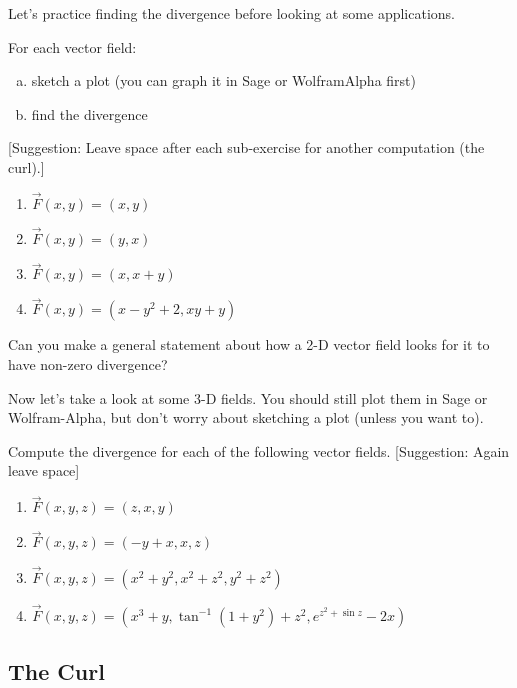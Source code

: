 Let's practice finding the divergence before looking at some applications.

\begin{problem}\label{2d_div}
\vskip0.1in
For each vector field: \\
\begin{enumerate}[(a)]
	\item sketch a plot (you can graph it in Sage or WolframAlpha first) 
	\item find the divergence
\end{enumerate}
[Suggestion: Leave space after each sub-exercise for another computation (the curl).]
\begin{enumerate}
\item $\vec{F}(x,y)=(x,y)$
\item $\vec{F}(x,y)=(y,x)$
\item $\vec{F}(x,y)=(x,x+y)$
\item $\vec{F}(x,y)=(x-y^2+2, xy+y)$
\end{enumerate}
Can you make a general statement about how a 2-D vector field looks for it to have non-zero divergence?
\end{problem}

Now let's take a look at some 3-D fields. You should still plot them in Sage or Wolfram-Alpha, but don't worry about sketching a plot (unless you want to).

\begin{problem}\label{3d_div}
Compute the divergence for each of the following vector fields. [Suggestion: Again leave space]
\begin{enumerate}
 \item $\vec F(x,y,z) = \left(z,x,y \right)$
 \item $\vec F(x,y,z) = \left(-y+x,x,z \right)$
 \item $\vec F(x,y,z) = \left(x^2+y^2,x^2+z^2,y^2+z^2 \right)$
 \item $\vec F(x,y,z) = \left(x^3+y,\tan^{-1}(1+y^2) + z^2,e^{z^2+\sin z} -2x\right)$
\end{enumerate}
\end{problem}

\subsection{The Curl}

